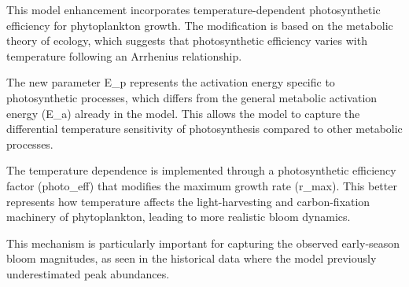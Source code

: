 This model enhancement incorporates temperature-dependent photosynthetic efficiency for phytoplankton growth. The modification is based on the metabolic theory of ecology, which suggests that photosynthetic efficiency varies with temperature following an Arrhenius relationship.

The new parameter E_p represents the activation energy specific to photosynthetic processes, which differs from the general metabolic activation energy (E_a) already in the model. This allows the model to capture the differential temperature sensitivity of photosynthesis compared to other metabolic processes.

The temperature dependence is implemented through a photosynthetic efficiency factor (photo_eff) that modifies the maximum growth rate (r_max). This better represents how temperature affects the light-harvesting and carbon-fixation machinery of phytoplankton, leading to more realistic bloom dynamics.

This mechanism is particularly important for capturing the observed early-season bloom magnitudes, as seen in the historical data where the model previously underestimated peak abundances.
